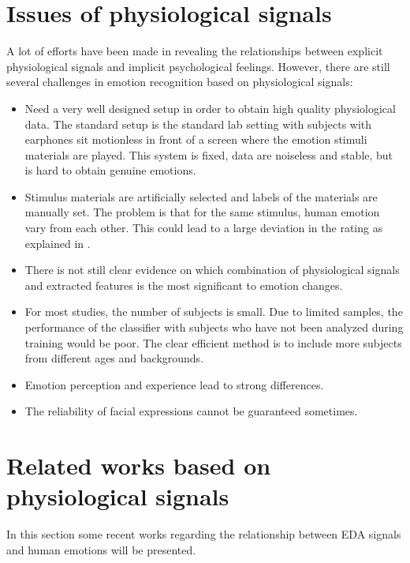 \section{Issues of physiological signals}
A lot of efforts have been made in revealing the relationships between explicit physiological signals and implicit psychological feelings. However, there are still several challenges in emotion recognition based on physiological signals:
\begin{itemize}
	\item Need a very well designed setup in order to obtain high quality physiological data. The standard setup is the standard lab setting with subjects with earphones  sit motionless in front of a screen where the emotion stimuli materials are played. This system is fixed, data are noiseless and stable, but is hard to obtain genuine emotions.
	\item Stimulus materials are artificially selected and labels of the materials are manually set. The problem is that for the same stimulus, human emotion vary from each other. This could lead to a large deviation in the rating as explained in \cite{muhl2011modality}.
	\item There is not still clear evidence on which combination of physiological signals and extracted features is the most significant to emotion changes.
	\item For most studies, the number of subjects is small. Due to limited samples, the performance of the classifier with subjects who have not been analyzed during training would be poor. The clear efficient method is to include more subjects from different ages and backgrounds.
	\item Emotion perception and experience lead to strong differences.
	\item The reliability of facial expressions cannot be guaranteed sometimes.
\end{itemize}

\section{Related works based on physiological signals}
In this section some recent works regarding the relationship between EDA signals and human emotions will be presented. 

